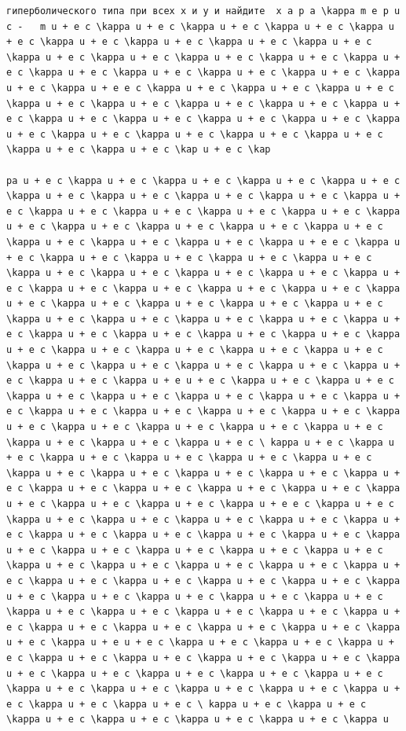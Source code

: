 \documentclass[
  ukrainian,
]{article}
\begin{document}
\begin{verbatim}
гиперболического типа при всех x и y и найдите  x a p a \kappa m e p u c -   m u + e c \kappa u + e c \kappa u + e c \kappa u + e c \kappa u + e c \kappa u + e c \kappa u + e c \kappa u + e c \kappa u + e c \kappa u + e c \kappa u + e c \kappa u + e c \kappa u + e c \kappa u + e c \kappa u + e c \kappa u + e c \kappa u + e c \kappa u + e c \kappa u + e c \kappa u + e e c \kappa u + e c \kappa u + e c \kappa u + e c \kappa u + e c \kappa u + e c \kappa u + e c \kappa u + e c \kappa u + e c \kappa u + e c \kappa u + e c \kappa u + e c \kappa u + e c \kappa u + e c \kappa u + e c \kappa u + e c \kappa u + e c \kappa u + e c \kappa u + e c \kappa u + e c \kap u + e c \kap

pa u + e c \kappa u + e c \kappa u + e c \kappa u + e c \kappa u + e c \kappa u + e c \kappa u + e c \kappa u + e c \kappa u + e c \kappa u + e c \kappa u + e c \kappa u + e c \kappa u + e c \kappa u + e c \kappa u + e c \kappa u + e c \kappa u + e c \kappa u + e c \kappa u + e c \kappa u + e c \kappa u + e c \kappa u + e c \kappa u + e e c \kappa u + e c \kappa u + e c \kappa u + e c \kappa u + e c \kappa u + e c \kappa u + e c \kappa u + e c \kappa u + e c \kappa u + e c \kappa u + e c \kappa u + e c \kappa u + e c \kappa u + e c \kappa u + e c \kappa u + e c \kappa u + e c \kappa u + e c \kappa u + e c \kappa u + e c \kappa u + e c \kappa u + e c \kappa u + e c \kappa u + e c \kappa u + e c \kappa u + e c \kappa u + e c \kappa u + e c \kappa u + e c \kappa u + e c \kappa u + e c \kappa u + e c \kappa u + e c \kappa u + e c \kappa u + e c \kappa u + e c \kappa u + e c \kappa u + e c \kappa u + e c \kappa u + e c \kappa u + e u + e c \kappa u + e c \kappa u + e c \kappa u + e c \kappa u + e c \kappa u + e c \kappa u + e c \kappa u + e c \kappa u + e c \kappa u + e c \kappa u + e c \kappa u + e c \kappa u + e c \kappa u + e c \kappa u + e c \kappa u + e c \kappa u + e c \kappa u + e c \kappa u + e c \kappa u + e c \ kappa u + e c \kappa u + e c \kappa u + e c \kappa u + e c \kappa u + e c \kappa u + e c \kappa u + e c \kappa u + e c \kappa u + e c \kappa u + e c \kappa u + e c \kappa u + e c \kappa u + e c \kappa u + e c \kappa u + e c \kappa u + e c \kappa u + e c \kappa u + e c \kappa u + e e c \kappa u + e c \kappa u + e c \kappa u + e c \kappa u + e c \kappa u + e c \kappa u + e c \kappa u + e c \kappa u + e c \kappa u + e c \kappa u + e c \kappa u + e c \kappa u + e c \kappa u + e c \kappa u + e c \kappa u + e c \kappa u + e c \kappa u + e c \kappa u + e c \kappa u + e c \kappa u + e c \kappa u + e c \kappa u + e c \kappa u + e c \kappa u + e c \kappa u + e c \kappa u + e c \kappa u + e c \kappa u + e c \kappa u + e c \kappa u + e c \kappa u + e c \kappa u + e c \kappa u + e c \kappa u + e c \kappa u + e c \kappa u + e c \kappa u + e c \kappa u + e c \kappa u + e c \kappa u + e u + e c \kappa u + e c \kappa u + e c \kappa u + e c \kappa u + e c \kappa u + e c \kappa u + e c \kappa u + e c \kappa u + e c \kappa u + e c \kappa u + e c \kappa u + e c \kappa u + e c \kappa u + e c \kappa u + e c \kappa u + e c \kappa u + e c \kappa u + e c \kappa u + e c \kappa u + e c \ kappa u + e c \kappa u + e c \kappa u + e c \kappa u + e c \kappa u + e c \kappa u + e c \kappa u 
\end{verbatim}
\end{document}
